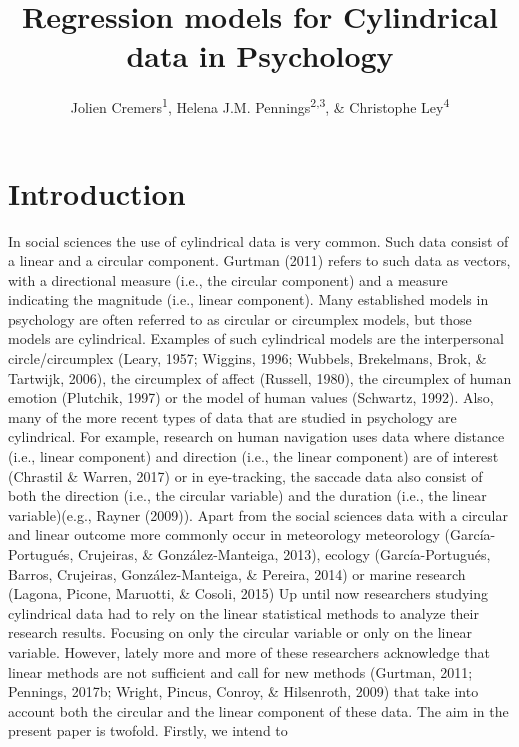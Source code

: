 \documentclass[man]{apa6}
\title{Regression models for Cylindrical data in Psychology}
\author{Jolien Cremers\textsuperscript{1}, Helena J.M.
Pennings\textsuperscript{2,3}, \& Christophe Ley\textsuperscript{4}}
\date{}
\affiliation{
\vspace{0.5cm}
\textsuperscript{1} Department of Methodology and Statistics, Utrecht University\\\textsuperscript{2} TNO\\\textsuperscript{3} Department of Education, Utrecht University\\\textsuperscript{4} Department of Applied Mathematics, Computer Science and Statistics, Ghent University}
\theoremstyle{definition}
\theoremstyle{definition}
\theoremstyle{definition}
\theoremstyle{remark}
\begin{document}
\maketitle

\section{Introduction}\label{Introduction}

In social sciences the use of cylindrical data is very common. Such data
consist of a linear and a circular component. Gurtman (2011) refers to
such data as vectors, with a directional measure (i.e., the circular
component) and a measure indicating the magnitude (i.e., linear
component). Many established models in psychology are often referred to
as circular or circumplex models, but those models are cylindrical.
Examples of such cylindrical models are the interpersonal
circle/circumplex (Leary, 1957; Wiggins, 1996; Wubbels, Brekelmans,
Brok, \& Tartwijk, 2006), the circumplex of affect (Russell, 1980), the
circumplex of human emotion (Plutchik, 1997) or the model of human
values (Schwartz, 1992). \newline \indent Also, many of the more recent
types of data that are studied in psychology are cylindrical. For
example, research on human navigation uses data where distance (i.e.,
linear component) and direction (i.e., the linear component) are of
interest (Chrastil \& Warren, 2017) or in eye-tracking, the saccade data
also consist of both the direction (i.e., the circular variable) and the
duration (i.e., the linear variable)(e.g., Rayner (2009)). Apart from
the social sciences data with a circular and linear outcome more
commonly occur in meteorology meteorology (García-Portugués, Crujeiras,
\& González-Manteiga, 2013), ecology (García-Portugués, Barros,
Crujeiras, González-Manteiga, \& Pereira, 2014) or marine research
(Lagona, Picone, Maruotti, \& Cosoli, 2015) \newline \indent Up until
now researchers studying cylindrical data had to rely on the linear
statistical methods to analyze their research results. Focusing on only
the circular variable or only on the linear variable. However, lately
more and more of these researchers acknowledge that linear methods are
not sufficient and call for new methods (Gurtman, 2011; Pennings, 2017b;
Wright, Pincus, Conroy, \& Hilsenroth, 2009) that take into account both
the circular and the linear component of these data. \newline
\indent The aim in the present paper is twofold. Firstly, we intend to
\end{document}
